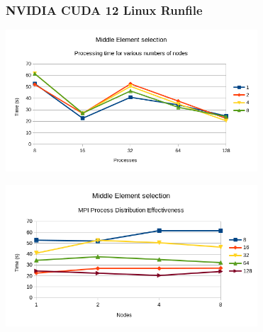 \documentclass[11pt]{article}
\begin{document}
\subsubsection{NVIDIA CUDA 12 Linux Runfile}
\label{sec:orgf292482}
\begin{center}
\includegraphics[height=200]{./charts/cuda-12-runfile/processing-time-nodes.png}
\end{center}
\begin{center}
\includegraphics[height=200]{./charts/cuda-12-runfile/process-distribution-effectiveness.png}
\end{center}
\end{document}
